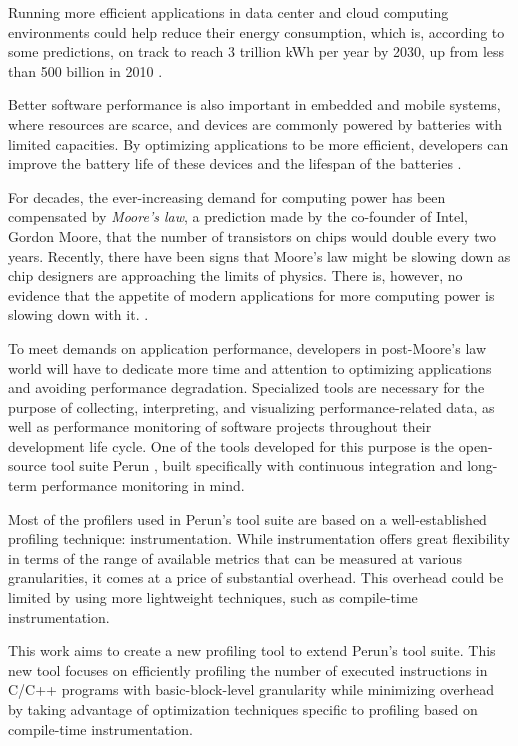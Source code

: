 Running more efficient applications in data center and cloud computing environments could help reduce their energy consumption, which is, according to some predictions, on track to reach 3 trillion kWh per year by  2030, up from less than 500 billion in 2010 \cite{datacenter-energy}. 

Better software performance is also important in embedded and mobile systems, where resources are scarce, and devices are commonly powered by batteries with limited capacities. By optimizing applications to be more efficient, developers can improve the battery life of these devices and the lifespan of the batteries \cite{embedded}.

For decades, the ever-increasing demand for computing power has been compensated by \emph{Moore's law}, a prediction made by the co-founder of Intel, Gordon Moore, that the number of transistors on chips would double every two years. Recently, there have been signs that Moore's law might be slowing down as chip designers are approaching the limits of physics. There is, however, no evidence that the appetite of modern applications for more computing power is slowing down with it. \cite{moores-law-1, moores-law-2-woods}.

To meet demands on application performance, developers in post-Moore's law world will have to dedicate more time and attention to optimizing applications and avoiding performance degradation. Specialized tools are necessary for the purpose of collecting, interpreting, and visualizing performance-related data, as well as performance monitoring of software projects throughout their development life cycle. One of the tools developed for this purpose is the open-source tool suite Perun \cite{perun-paper}, built specifically with continuous integration and long-term performance monitoring in mind.

Most of the profilers used in Perun's tool suite are based on a well-established profiling technique: instrumentation. While instrumentation offers great flexibility in terms of the range of available metrics that can be measured at various granularities, it comes at a price of substantial overhead. This overhead could be limited by using more lightweight techniques, such as compile-time instrumentation.

This work aims to create a new profiling tool to extend Perun's tool suite. This new tool focuses on efficiently profiling the number of executed instructions in C/C++ programs with basic-block-level granularity while minimizing overhead by taking advantage of optimization techniques specific to profiling based on compile-time instrumentation. 


